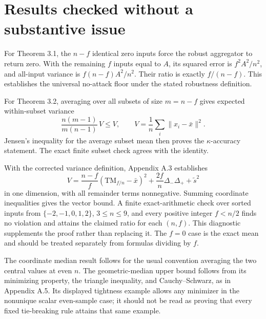 \documentclass[10pt]{article}
\begin{document}
\section*{Results checked without a substantive issue}
For Theorem 3.1, the \(n-f\) identical zero inputs force the robust aggregator to return zero. With the remaining \(f\) inputs equal to \(A\), its squared error is \(f^2A^2/n^2\), and all-input variance is \(f(n-f)A^2/n^2\). Their ratio is exactly \(f/(n-f)\). This establishes the universal no-attack floor under the stated robustness definition.\par
For Theorem 3.2, averaging over all subsets of size \(m=n-f\) gives expected within-subset variance \[\frac{n(m-1)}{m(n-1)}\,V\leq V,\qquad
 V=\frac1n\sum_i\|x_i-\bar x\|^2 .\] Jensen’s inequality for the average subset mean then proves the \(\kappa\)-accuracy statement. The exact finite subset check agrees with the identity.\par
With the corrected variance definition, Appendix A.3 establishes \[V=\frac{n-f}{f}(\mathrm{TM}_{f/n}-\bar x)^2+
 \frac{2f}{n}\Delta_-\Delta_++\widetilde s^2\] in one dimension, with all remainder terms nonnegative. Summing coordinate inequalities gives the vector bound. A finite exact-arithmetic check over sorted inputs from \(\{-2,-1,0,1,2\}\), \(3\leq n\leq9\), and every positive integer \(f<n/2\) finds no violation and attains the claimed ratio for each \((n,f)\). This diagnostic supplements the proof rather than replacing it. The \(f=0\) case is the exact mean and should be treated separately from formulas dividing by \(f\).\par
The coordinate median result follows for the usual convention averaging the two central values at even \(n\). The geometric-median upper bound follows from its minimizing property, the triangle inequality, and Cauchy–Schwarz, as in Appendix A.5. Its displayed tightness example allows any minimizer in the nonunique scalar even-sample case; it should not be read as proving that every fixed tie-breaking rule attains that same example.\par
\end{document}
